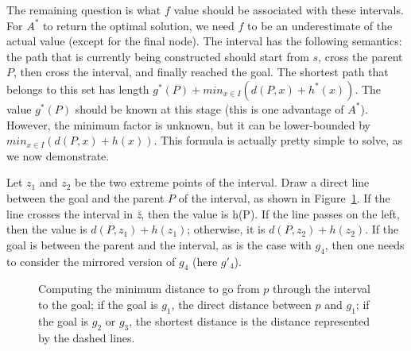 
The remaining question is what $f$ value 
should be associated with these intervals.  
For $A^*$ to return the optimal solution, 
we need $f$ to be an underestimate of the actual value 
(except for the final node).  
The interval has the following semantics: 
the path that is currently being constructed 
should start from $s$, cross the parent $P$, 
then cross the interval, and finally reached the goal.  
The shortest path that belongs to this set 
has length $g^*(P) + min_{x \in I}(d(P,x) + h^*(x))$.  
The value $g^*(P)$ should be known at this stage 
(this is one advantage of $A^*$).  
However, the minimum factor is unknown, 
but it can be lower-bounded by $min_{x \in I}(d(P,x) + h(x))$.  
This formula is actually pretty simple to solve, as we now demonstrate.  

Let $z_1$ and $z_2$ be the two extreme points of the interval.  
Draw a direct line between the goal and the parent $P$ of the interval, 
as shown in Figure~\ref{fig::fvalue}.  
If the line crosses the interval in \textit{\u z}, then the value is h(P).  If the line passes on the left, 
then the value is $d(P,z_1)+h(z_1)$; 
otherwise, it is $d(P,z_2)+h(z_2)$.  
If the goal is between the parent and the interval, 
as is the case with $g_4$, 
then one needs to consider the mirrored version of $g_4$ 
(here $g'_4$).  

\begin{figure}[ht]
  \begin{center}
    
  \end{center}
  \caption{Computing the minimum distance 
    to go from $p$ through the interval to the goal; 
    if the goal is $g_1$, the direct distance between $p$ and $g_1$; 
    if the goal is $g_2$ or $g_3$, 
    the shortest distance is the distance represented by the dashed lines.}
  \label{fig::fvalue}
\end{figure}
